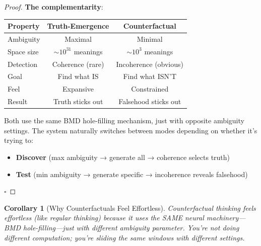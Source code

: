 \documentclass[11pt,a4paper]{article}
\newtheorem{corollary}[theorem]{Corollary}
\begin{document}
\begin{proof}
\textbf{The complementarity}:

\begin{center}
\begin{tabular}{lcc}
\toprule
\textbf{Property} & \textbf{Truth-Emergence} & \textbf{Counterfactual} \\
\midrule
Ambiguity & Maximal & Minimal \\
Space size & $\sim 10^{31}$ meanings & $\sim 10^3$ meanings \\
Detection & Coherence (rare) & Incoherence (obvious) \\
Goal & Find what IS & Find what ISN'T \\
Feel & Expansive & Constrained \\
Result & Truth sticks out & Falsehood sticks out \\
\bottomrule
\end{tabular}
\end{center}

Both use the same BMD hole-filling mechanism, just with opposite ambiguity settings. The system naturally switches between modes depending on whether it's trying to:
\begin{itemize}
\item \textbf{Discover} (max ambiguity → generate all → coherence selects truth)
\item \textbf{Test} (min ambiguity → generate specific → incoherence reveals falsehood)
\end{itemize}

$\square$
\end{proof}

\begin{corollary}[Why Counterfactuals Feel Effortless]
\label{cor:counterfactual_effortless}
Counterfactual thinking feels effortless (like regular thinking) because it uses the SAME neural machinery—BMD hole-filling—just with different ambiguity parameter. You're not doing different computation; you're sliding the same windows with different settings.
\end{corollary}
\end{document}
